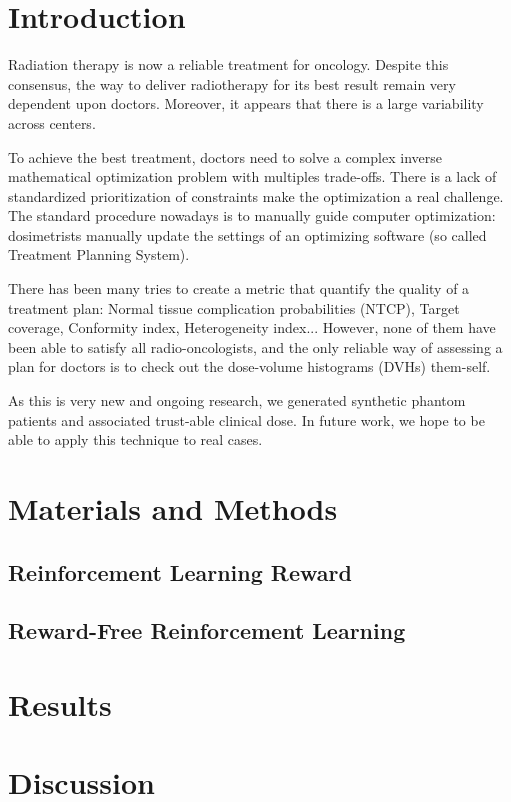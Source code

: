 \section{Introduction}

Radiation therapy is now a reliable treatment for oncology.
Despite this consensus, the way to deliver radiotherapy for its best result remain very dependent upon doctors.
Moreover, it appears that there is a large variability across centers.

To achieve the best treatment, doctors need to solve a complex inverse mathematical optimization problem with multiples trade-offs.
There is a lack of standardized prioritization of constraints make the optimization a real challenge.
The standard procedure nowadays is to manually guide computer optimization: dosimetrists manually update the settings of an optimizing software (so called Treatment Planning System).

There has been many tries to create a metric that quantify the quality of a treatment plan: Normal tissue complication probabilities (NTCP), Target coverage, Conformity index, Heterogeneity index...
However, none of them have been able to satisfy all radio-oncologists, and the only reliable way of assessing a plan for doctors is to check out the dose-volume histograms (DVHs) them-self.

As this is very new and ongoing research, we generated synthetic phantom patients and associated trust-able clinical dose.
In future work, we hope to be able to apply this technique to real cases.

\section{Materials and Methods}

\subsection{Reinforcement Learning Reward}

\subsection{Reward-Free Reinforcement Learning}


\section{Results}

\section{Discussion}



